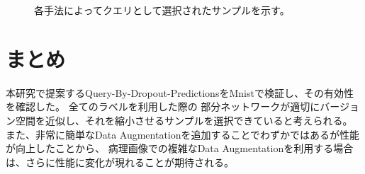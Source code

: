 \begin{figure}[hbp]
    \begin{center}
        \vspace{0.5cm}
    \caption{\label{figure:mnist_query_examples}各手法によってクエリとして選択されたサンプルを示す。}
    \end{center}
\end{figure}

\section{まとめ}
本研究で提案するQuery-By-Dropout-PredictionsをMnistで検証し、その有効性を確認した。
全てのラベルを利用した際の
部分ネットワークが適切にバージョン空間を近似し、それを縮小させるサンプルを選択できていると考えられる。
また、非常に簡単なData Augmentationを追加することでわずかではあるが性能が向上したことから、
病理画像での複雑なData Augmentationを利用する場合は、さらに性能に変化が現れることが期待される。
